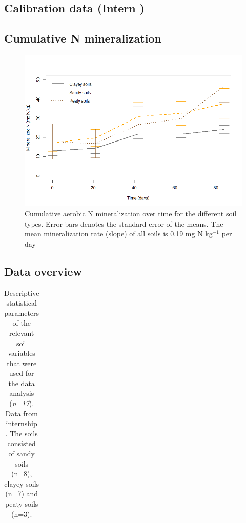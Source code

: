\documentclass[10pt,twoside,dutch,english]{report}
\begin{document}
\begin{appendices}
\makeatletter
{}
\makeatother

\chapter{Calibration data (Intern \citet{Echeverri2014})}
	\label{chap: Calibration data}
\section{Cumulative N mineralization }
	\begin{figure}[h] %
	\centering
	\includegraphics[width=0.8\linewidth]{results_Ncum}
	\caption{Cumulative aerobic N mineralization over time for the different soil types. Error bars denotes the standard error of the means. The mean mineralization rate (slope) of all soils is 0.19 mg N kg$^{-1}$ per day}
	\label{fig:results_Ncum}
\end{figure}

\section{Data overview}
	\footnotesize 
			\begin{longtabu} to \textwidth{X[1.6,l]X[1,l]X[1,r]X[1,r]X[1,r]X[1,r]X[1,r]}
           \caption{Descriptive statistical parameters of the relevant soil variables that were used for the data analysis (\textit{n=17}). Data from internship \cite{Echeverri2014}. The soils consisted of sandy soils (n=8), clayey soils (n=7) and peaty soils (n=3).} \label{tab: results_char} \\
            	


\end{longtabu}
\end{appendices}
\end{document}
